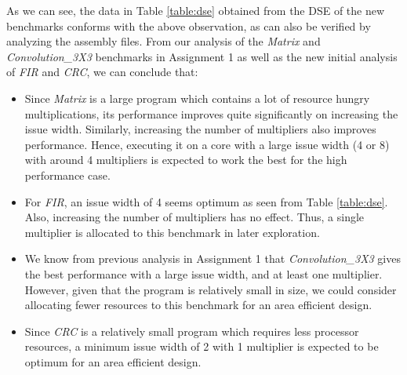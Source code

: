 \documentclass[conference]{IEEEtran}
\begin{document}
As we can see, the data in Table \ref{table:dse} obtained from the DSE of the new benchmarks conforms with the above observation, as can also be verified by analyzing the assembly files.
From our analysis of the \textit{Matrix} and \textit{Convolution\_3X3} benchmarks in Assignment 1 as well as the new initial analysis of \textit{FIR} and \textit{CRC}, we can conclude that:
\begin{itemize}
    \item Since \textit{Matrix} is a large program which contains a lot of resource hungry multiplications, its performance improves quite significantly on increasing the issue width. Similarly, increasing the number of multipliers also improves performance. Hence, executing it on a core with a large issue width (4 or 8) with around 4 multipliers is expected to work the best for the high performance case.
    \item For \textit{FIR}, an issue width of 4 seems optimum as seen from Table \ref{table:dse}. Also, increasing the number of multipliers has no effect. Thus, a single multiplier is allocated to this benchmark in later exploration.
    \item We know from previous analysis in Assignment 1 that \textit{Convolution\_3X3} gives the best performance with a large issue width, and at least one multiplier. However, given that the program is relatively small in size, we could consider allocating fewer resources to this benchmark for an area efficient design.
    \item Since \textit{CRC} is a relatively small program which requires less processor resources, a minimum issue width of 2 with 1 multiplier is expected to be optimum for an area efficient design.

\end{itemize}
\end{document}
